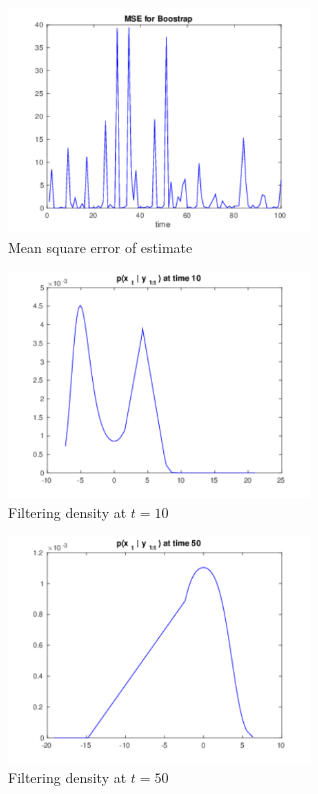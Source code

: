 \documentclass[11pt]{article}
\begin{document}
\begin{figure}[h]
  
  \centering
    \includegraphics[width=80mm]{../figs/014_15_mseN1000.pdf}
    \caption{Mean square error of estimate}
    \label{n10001}
\end{figure}

\begin{figure}[h]
  
  \centering
    \includegraphics[width=80mm]{../figs/015_15_t10N1000.pdf}
    \caption{Filtering density at $t=10$}
    \label{n10002}
\end{figure}

\begin{figure}[h]
  
  \centering
    \includegraphics[width=80mm]{../figs/016_15_t50N1000.pdf}
    \caption{Filtering density at $t=50$}
    \label{n10003}
\end{figure}
\end{document}
